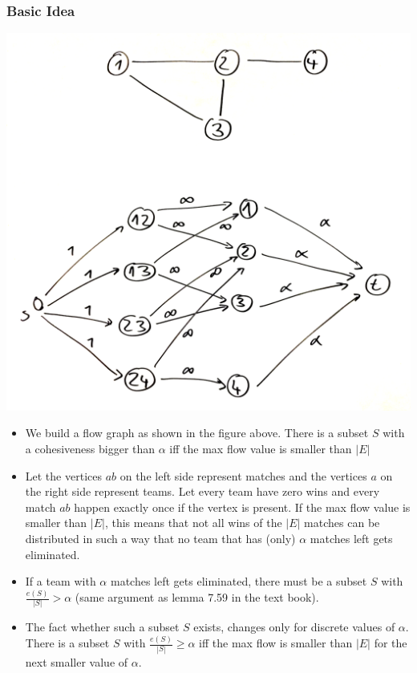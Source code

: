 \documentclass[12pt]{article}
\begin{document}
\subsubsection*{Basic Idea}
\includegraphics[width=\textwidth]{2.pdf}
\begin{itemize}
	\item We build a flow graph as shown in the figure above. There is a subset $S$ with a cohesiveness bigger than $\alpha$ iff the max flow value is smaller than $|E|$
	\item Let the vertices $ab$ on the left side represent matches and the vertices $a$ on the right side represent teams. Let every team have zero wins and every match $ab$ happen exactly once if the vertex is present. If the max flow value is smaller than $|E|$, this means that not all wins of the $|E|$ matches can be distributed in such a way that no team that has (only) $\alpha$ matches left gets eliminated.
	\item If a team with $\alpha$ matches left gets eliminated, there must be a subset $S$ with $\frac{e(S)}{|S|} > \alpha$ (same argument as lemma 7.59 in the text book). 
	\item The fact whether such a subset $S$ exists, changes only for discrete values of $\alpha$. There is a subset $S$ with $\frac{e(S)}{|S|} \geq \alpha$ iff the max flow is smaller than $|E|$ for the next smaller value of $\alpha$.
\end{itemize}
\end{document}
